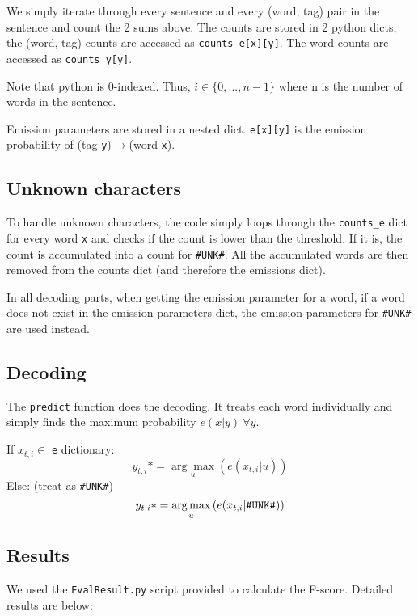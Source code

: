 \documentclass[12pt]{article}
\begin{document}
We simply iterate through every sentence and every (word, tag) pair in the sentence and count the 2 sums above.
The counts are stored in 2 python dicts, the (word, tag) counts are accessed as \verb|counts_e[x][y]|. The word counts are accessed as \verb|counts_y[y]|.

Note that python is 0-indexed. Thus, \(i \in \{0,...,n-1\}\) where n is the number of words in the sentence.

Emission parameters are stored in a nested dict. \verb|e[x][y]| is the emission probability of (tag \verb|y|)\(\rightarrow\)(word \verb|x|).

\subsection{Unknown characters}

To handle unknown characters, the code simply loops through the \verb|counts_e| dict for every word \texttt{x} and checks if the count is lower than the threshold. If it is, the count is accumulated into a count for \verb|#UNK#|. All the accumulated words are then removed from the counts dict (and therefore the emissions dict).

In all decoding parts, when getting the emission parameter for a word, if a word does not exist in the emission parameters dict, the emission parameters for \verb|#UNK#| are used instead.

\subsection{Decoding}

The \texttt{predict} function does the decoding. It treats each word individually and simply finds the maximum probability \( e(x|y) \ \forall y \).

If \(x_{t,i} \in \) \verb|e| dictionary:
\[y_{t,i}* = \underset{u}{\arg\max} \left( e(x_{t,i}|u) \right) \]
Else: (treat as \verb|#UNK#|)
\[y_{t,i}* = \underset{u}{\arg\max} \left( e(x_{t,i}|\verb|#UNK#|) \right) \]

\subsection{Results}
We used the \texttt{EvalResult.py} script provided to calculate the F-score. Detailed results are below:
\end{document}
